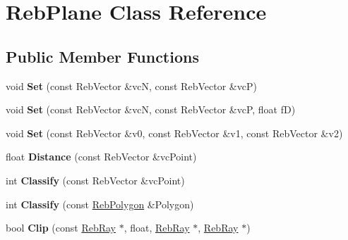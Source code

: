 \hypertarget{class_reb_plane}{}\section{Reb\+Plane Class Reference}
\label{class_reb_plane}
\subsection*{Public Member Functions}
\begin{DoxyCompactItemize}
\item 
void {\bfseries Set} (const Reb\+Vector \&vcN, const Reb\+Vector \&vcP)\hypertarget{class_reb_plane_ad336c095d7defbf56f3260b6804b432a}{}\label{class_reb_plane_ad336c095d7defbf56f3260b6804b432a}

\item 
void {\bfseries Set} (const Reb\+Vector \&vcN, const Reb\+Vector \&vcP, float fD)\hypertarget{class_reb_plane_a69a3bf1a922a8a37e5eebb62c5ea7b6b}{}\label{class_reb_plane_a69a3bf1a922a8a37e5eebb62c5ea7b6b}

\item 
void {\bfseries Set} (const Reb\+Vector \&v0, const Reb\+Vector \&v1, const Reb\+Vector \&v2)\hypertarget{class_reb_plane_a097452cd1060a31e486ab184ae6f8660}{}\label{class_reb_plane_a097452cd1060a31e486ab184ae6f8660}

\item 
float {\bfseries Distance} (const Reb\+Vector \&vc\+Point)\hypertarget{class_reb_plane_a78eafb6189a2cd5fa04f62d2f3af3431}{}\label{class_reb_plane_a78eafb6189a2cd5fa04f62d2f3af3431}

\item 
int {\bfseries Classify} (const Reb\+Vector \&vc\+Point)\hypertarget{class_reb_plane_aba443c74d06e3825b0d3a81f49f79462}{}\label{class_reb_plane_aba443c74d06e3825b0d3a81f49f79462}

\item 
int {\bfseries Classify} (const \hyperlink{class_reb_polygon}{Reb\+Polygon} \&Polygon)\hypertarget{class_reb_plane_a5ccf4f31680a0eca5153fab9cf4012fc}{}\label{class_reb_plane_a5ccf4f31680a0eca5153fab9cf4012fc}

\item 
bool {\bfseries Clip} (const \hyperlink{class_reb_ray}{Reb\+Ray} $\ast$, float, \hyperlink{class_reb_ray}{Reb\+Ray} $\ast$, \hyperlink{class_reb_ray}{Reb\+Ray} $\ast$)\hypertarget{class_reb_plane_a0d90abd91dd0cdd2784a1cf8d7611307}{}\label{class_reb_plane_a0d90abd91dd0cdd2784a1cf8d7611307}


\end{DoxyCompactItemize}
